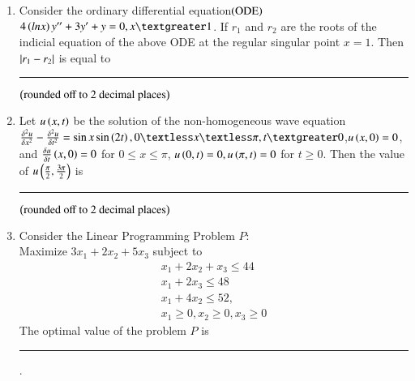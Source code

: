 \documentclass[journal]{IEEEtran}
\begin{document}
\begin{enumerate}
{}
\item{
Consider the ordinary differential equation$\left(\text{ODE}\right)$ $4\brak{lnx}y^{\prime\prime}+3y^{\prime}+y=0,x\textgreater 1$. If $r_1$ and $r_2$ are the roots of the indicial equation of the above ODE at the regular singular point $x=1$. Then $\left\vert r_1-r_2\right\vert$ is equal to\rule{2cm}{0.15mm}$\left(\text{rounded off to $2$ decimal places}\right)$\\
}
\item{
Let $u\left(x,t\right)$ be the solution of the non-homogeneous wave equation\\ $\frac{\delta^2u}{\delta x^2}-\frac{\delta^2 u}{\delta t^2}=\sin x\sin\brak{2t},0\textless x\textless\pi,t\textgreater 0$,$u\left(x,0\right)=0$, and $\frac{\delta u}{\delta t}\left(x,0\right)=0$ for $0\leq x\leq\pi$, 
 $u\left(0,t\right)=0,u\left(\pi,t\right)=0$ for $t\geq 0$.
Then the value of $u\left(\frac{\pi}{2},\frac{3\pi}{2}\right)$ is\rule{2cm}{0.15mm}$\left(\text{rounded off to $2$ decimal places}\right)$
}
\item{
Consider the Linear Programming Problem $P$:\\ Maximize $3x_1+2x_2+5x_3$ subject to 
\begin{align}
    x_1+2x_2+x_3\leq 44\\
    x_1+2x_3\leq 48\\
    x_1+4x_2\leq 52,\\
    x_1\geq 0,x_2\geq 0, x_3\geq 0
\end{align}
The optimal value of the problem $P$ is \rule{2cm}{0.15mm}.
}
\end{enumerate}
\end{document}
